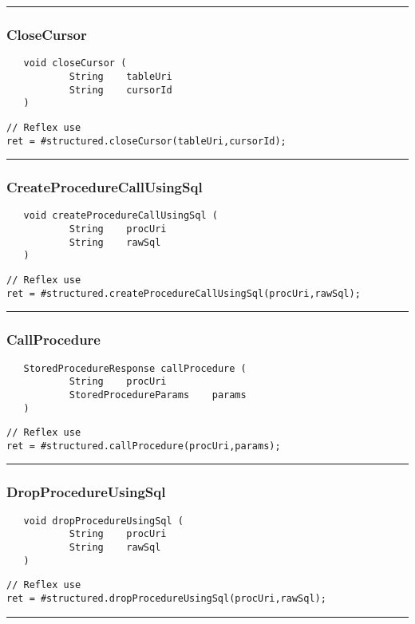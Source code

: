 \rule{15cm}{2pt}
\subsubsection{CloseCursor}
\label{Api:CloseCursor}
\begin{verbatim}
   void closeCursor (
           String    tableUri
           String    cursorId
   )
\end{verbatim}
\begin{lstlisting}[language=reflex]
// Reflex use
ret = #structured.closeCursor(tableUri,cursorId);
\end{lstlisting}



\rule{15cm}{2pt}
\subsubsection{CreateProcedureCallUsingSql}
\label{Api:CreateProcedureCallUsingSql}
\begin{verbatim}
   void createProcedureCallUsingSql (
           String    procUri
           String    rawSql
   )
\end{verbatim}
\begin{lstlisting}[language=reflex]
// Reflex use
ret = #structured.createProcedureCallUsingSql(procUri,rawSql);
\end{lstlisting}



\rule{15cm}{2pt}
\subsubsection{CallProcedure}
\label{Api:CallProcedure}
\begin{verbatim}
   StoredProcedureResponse callProcedure (
           String    procUri
           StoredProcedureParams    params
   )
\end{verbatim}
\begin{lstlisting}[language=reflex]
// Reflex use
ret = #structured.callProcedure(procUri,params);
\end{lstlisting}



\rule{15cm}{2pt}
\subsubsection{DropProcedureUsingSql}
\label{Api:DropProcedureUsingSql}
\begin{verbatim}
   void dropProcedureUsingSql (
           String    procUri
           String    rawSql
   )
\end{verbatim}
\begin{lstlisting}[language=reflex]
// Reflex use
ret = #structured.dropProcedureUsingSql(procUri,rawSql);
\end{lstlisting}



\rule{15cm}{2pt}
